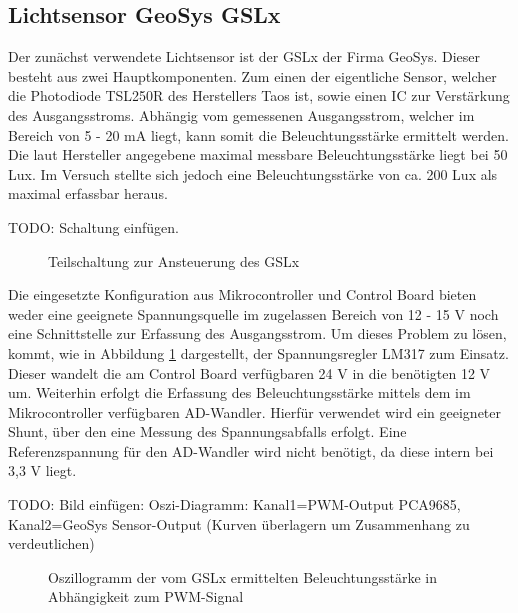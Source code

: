 \documentclass[a4paper,12pt]{scrartcl}
\begin{document}
\subsection{Lichtsensor GeoSys GSLx}
Der zunächst verwendete Lichtsensor ist der GSLx der Firma GeoSys. Dieser besteht aus zwei Hauptkomponenten. Zum einen der eigentliche Sensor, welcher die Photodiode TSL250R des Herstellers Taos ist, sowie einen IC zur Verstärkung des Ausgangsstroms. Abhängig vom gemessenen Ausgangsstrom, welcher im Bereich von 5 - 20 mA liegt, kann somit die Beleuchtungsstärke ermittelt werden. Die laut Hersteller angegebene maximal messbare Beleuchtungsstärke liegt bei 50 Lux. Im Versuch stellte sich jedoch eine Beleuchtungsstärke von ca. 200 Lux als maximal erfassbar heraus.

TODO: Schaltung einfügen.

\begin{figure}[htb]
\begin{center}
\end{center}
\caption[Teilschaltung zur Ansteuerung des GSLx, Quelle: Autoren]{\label{fig:schaltungGSLx}Teilschaltung zur Ansteuerung des GSLx}
\end{figure}

Die eingesetzte Konfiguration aus Mikrocontroller und Control Board bieten weder eine geeignete Spannungsquelle im zugelassen Bereich von 12 - 15 V noch eine Schnittstelle zur Erfassung des Ausgangsstrom. Um dieses Problem zu lösen, kommt, wie in Abbildung \ref{fig:schaltungGSLx} dargestellt, der Spannungsregler LM317 zum Einsatz. Dieser wandelt die am Control Board verfügbaren 24 V in die benötigten 12 V um. Weiterhin erfolgt die Erfassung des Beleuchtungsstärke mittels dem im Mikrocontroller verfügbaren AD-Wandler. Hierfür verwendet wird ein geeigneter Shunt, über den eine Messung des Spannungsabfalls erfolgt. Eine Referenzspannung für den AD-Wandler wird nicht benötigt, da diese intern bei 3,3 V liegt. 

TODO: Bild einf\"ugen: Oszi-Diagramm: Kanal1=PWM-Output PCA9685, Kanal2=GeoSys Sensor-Output (Kurven \"uberlagern um Zusammenhang zu verdeutlichen)

\begin{figure}[htb]
\begin{center}
\end{center}
\caption[Oszillogramm der vom GSLx ermittelten Beleuchtungsstärke in Abhängigkeit zum PWM-Signal, Quelle: Autoren]{\label{fig:gslOszi}Oszillogramm der vom GSLx ermittelten Beleuchtungsstärke in Abhängigkeit zum PWM-Signal}
\end{figure}
\end{document}
